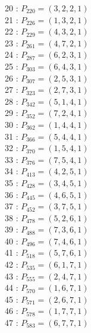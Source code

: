 \documentclass{article}
\begin{document}
{\begin{multicols}{2}
20 : $P_{220}=( 3, 2, 2, 1 )$\\
21 : $P_{226}=( 1, 3, 2, 1 )$\\
22 : $P_{229}=( 4, 3, 2, 1 )$\\
23 : $P_{261}=( 4, 7, 2, 1 )$\\
24 : $P_{287}=( 6, 2, 3, 1 )$\\
25 : $P_{303}=( 6, 4, 3, 1 )$\\
26 : $P_{307}=( 2, 5, 3, 1 )$\\
27 : $P_{323}=( 2, 7, 3, 1 )$\\
28 : $P_{342}=( 5, 1, 4, 1 )$\\
29 : $P_{352}=( 7, 2, 4, 1 )$\\
30 : $P_{362}=( 1, 4, 4, 1 )$\\
31 : $P_{366}=( 5, 4, 4, 1 )$\\
32 : $P_{370}=( 1, 5, 4, 1 )$\\
33 : $P_{376}=( 7, 5, 4, 1 )$\\
34 : $P_{413}=( 4, 2, 5, 1 )$\\
35 : $P_{428}=( 3, 4, 5, 1 )$\\
36 : $P_{445}=( 4, 6, 5, 1 )$\\
37 : $P_{452}=( 3, 7, 5, 1 )$\\
38 : $P_{478}=( 5, 2, 6, 1 )$\\
39 : $P_{488}=( 7, 3, 6, 1 )$\\
40 : $P_{496}=( 7, 4, 6, 1 )$\\
41 : $P_{518}=( 5, 7, 6, 1 )$\\
42 : $P_{535}=( 6, 1, 7, 1 )$\\
43 : $P_{555}=( 2, 4, 7, 1 )$\\
44 : $P_{570}=( 1, 6, 7, 1 )$\\
45 : $P_{571}=( 2, 6, 7, 1 )$\\
46 : $P_{578}=( 1, 7, 7, 1 )$\\
47 : $P_{583}=( 6, 7, 7, 1 )$\\
\end{multicols}
}
\end{document}
